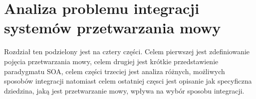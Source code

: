 
\chapter{Analiza problemu integracji systemów przetwarzania mowy} %



\ifpdf
    \graphicspath{{2/figures/PNG/}{2/figures/PDF/}{2/figures/}}
\else
    \graphicspath{{2/figures/EPS/}{2/figures/}}
\fi


Rozdział ten podzielony jest na cztery części. Celem pierwszej jest zdefiniowanie pojęcia przetwarzania mowy, celem drugiej jest krótkie przedstawienie paradygmatu SOA, celem części trzeciej jest analiza różnych, możliwych sposobów integracji natomiast celem ostatniej częsci jest opisanie jak specyficzna dziedzina, jaką jest przetwarzanie mowy, wpływa na wybór sposobu integracji.

